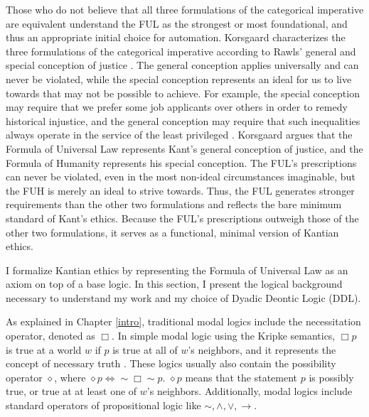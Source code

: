 \begin{isabellebody}
\begin{isamarkuptext}
Those who do not believe that all three formulations of the categorical imperative are equivalent
understand the FUL as the strongest or most foundational, and thus an appropriate initial choice for 
automation. Korsgaard characterizes the three formulations of the categorical
imperative according to Rawls' general and special conception of justice \cite{theoryofjustice}. The general conception applies
universally and can never be violated, while the special conception represents an ideal for us to
live towards that may not be possible to achieve. For example, the special conception may require that we prefer some job applicants
over others in order to remedy historical injustice, and the general conception may require that such
inequalities always operate in the service of the least privileged \citep[19]{KorsgaardRTL}. Korsgaard
argues that the Formula of Universal Law represents Kant's general conception of justice, and the Formula of 
Humanity represents his special conception. The FUL's prescriptions can never be violated, even in the most
non-ideal circumstances imaginable, but the FUH is merely an ideal to strive towards. Thus, the FUL 
generates stronger requirements than the other two formulations and reflects 
the bare minimum standard of Kant's ethics. Because the FUL's prescriptions outweigh those of the other two formulations,
it serves as a functional, minimal version of Kantian ethics.%
\end{isamarkuptext}\isamarkuptrue%
%
\isadelimdocument
%
\endisadelimdocument
%
\isatagdocument
%
\isamarkuptrue%
%
\endisatagdocument
{\isafolddocument}%
%
\isadelimdocument
%
\endisadelimdocument
%
\begin{isamarkuptext}%
I formalize Kantian ethics by representing the Formula of Universal Law as an axiom on top of a base
logic. In this section, I present the logical background necessary to understand my work and my 
choice of Dyadic Deontic Logic (DDL).

As explained in Chapter \ref{intro}, traditional modal logics include the necessitation operator, denoted as $\Box$. In simple modal logic
using the Kripke semantics, $\Box p$ is true at a world $w$ if $p$ is true at all of $w$'s neighbors, 
and it represents the concept of necessary truth \citep{cresswell}. 
These logics usually also contain the possibility operator $\diamond$, where $\diamond p \iff \sim \Box \sim p$. 
$\diamond p$ means that the statement $p$ is possibly true, or true at at least one of $w$'s neighbors. 
Additionally, modal logics include standard operators of propositional logic like $\sim, \wedge, \vee, \rightarrow$.


\end{isamarkuptext}
\end{isabellebody}
